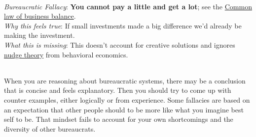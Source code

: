



\ \\
\textit{Bureaucratic Fallacy}: 
\textbf{You cannot pay a little and get a lot}; see the \href{https://en.wikipedia.org/wiki/Common_law_of_business_balance}{Common law of business balance}. 
 \\
\textit{Why this feels true}: If small investments made a big difference we'd already be making the investment.\\
\textit{What this is missing}: This doesn't account for creative solutions and ignores \href{https://en.wikipedia.org/wiki/Nudge_theory}{nudge theory} from behavioral economics. 

\ \\

When you are reasoning about bureaucratic systems, there may be a conclusion that is concise and feels explanatory. Then you should try to come up with counter examples, either logically or from experience.  Some fallacies are based on an expectation that other people should to be more like what you imagine best self to be. That mindset fails to account for your own shortcomings and the diversity of other bureaucrats. 

